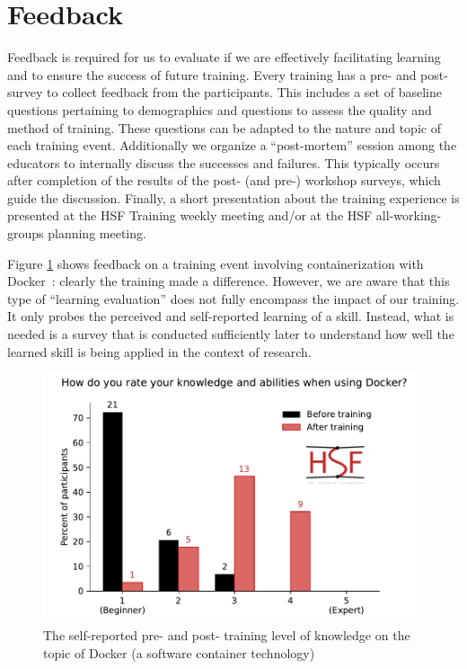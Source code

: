 \documentclass[twocolumn]{svjour3}          %
\begin{document}
\section{Feedback}\label{sec:Feedback}
%
Feedback is required for us to evaluate if we are effectively facilitating learning and to ensure the success of future training. Every training has a pre- and post- survey to collect feedback from the participants. This includes a set of baseline questions pertaining to demographics and questions to assess the quality and method of training. These questions can be adapted to the nature and topic of each training event. Additionally we organize a \enquote{post-mortem} session among the educators to internally discuss the successes and failures. This typically occurs after completion of the results of the post- (and pre-) workshop surveys, which guide the discussion. Finally, a short presentation about the training experience is presented at the HSF Training weekly meeting and/or at the HSF all-working-groups planning meeting.

Figure \ref{fig:dockerfeedback} shows feedback on a training event involving containerization with Docker~\cite{HSF-training-Docker-2020}: clearly the training made a difference.  However, we are aware that this type of \enquote{learning evaluation} does not fully encompass the impact of our training. It only probes the perceived and self-reported learning of a skill. Instead, what is needed is a survey that is conducted sufficiently later to understand how well the learned skill is being applied in the context of research.
%
\begin{figure}
\centering
\includegraphics[width=11cm]{dockerfeedback_new.pdf}
\caption{The self-reported  pre- and post- training level of knowledge on the topic of Docker (a software container technology)
\label{fig:dockerfeedback}}
\end{figure}
%
\end{document}
